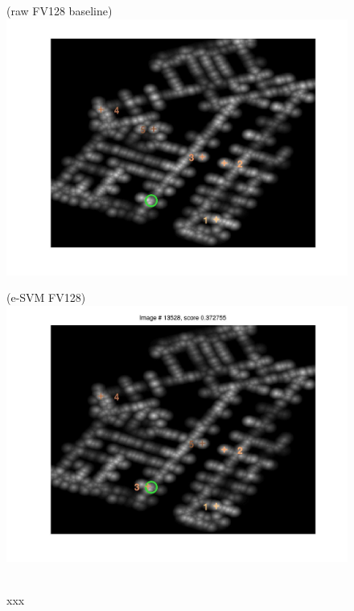 \documentclass[10pt,onecolumn,A4]{article}
\begin{document}
\begin{figure}
	\begin{minipage}{0.45\linewidth}
		\center
		(raw FV128 baseline) \\
		\includegraphics[trim = 55mm 40mm 55mm 25mm, clip=true,width=\linewidth]{sup1666/heatRaw.jpg}
	\end{minipage} 
	\begin{minipage}{0.45\linewidth}
		\center
		(e-SVM FV128) \\
		\includegraphics[trim = 55mm 40mm 55mm 25mm, clip=true,width=\linewidth]{sup1666/heatSvm.jpg}
	\end{minipage} 
	\\
	\textcolor{myWhite}{xxx}\\

\end{figure}
\end{document}
